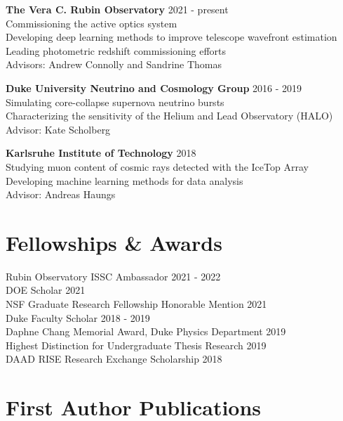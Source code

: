\documentclass[margin, 11pt]{res}
\begin{document}
\begin{resume}
\textbf{The Vera C. Rubin Observatory} \hfill 2021 - present \\
Commissioning the active optics system \\
Developing deep learning methods to improve telescope wavefront estimation \\
Leading photometric redshift commissioning efforts \\
Advisors: Andrew Connolly and Sandrine Thomas

\textbf{Duke University Neutrino and Cosmology Group} \hfill 2016 - 2019 \\
Simulating core-collapse supernova neutrino bursts \\
Characterizing the sensitivity of the Helium and Lead Observatory (HALO) \\
Advisor: Kate Scholberg

\textbf{Karlsruhe Institute of Technology} \hfill 2018 \\
Studying muon content of cosmic rays detected with the IceTop Array \\
Developing machine learning methods for data analysis \\
Advisor: Andreas Haungs

\section{Fellowships \& Awards}
Rubin Observatory ISSC Ambassador \hfill 2021 - 2022 \\
DOE Scholar \hfill 2021 \\
NSF Graduate Research Fellowship Honorable Mention \hfill 2021 \\
Duke Faculty Scholar \hfill 2018 - 2019 \\
Daphne Chang Memorial Award, Duke Physics Department \hfill 2019 \\
Highest Distinction for Undergraduate Thesis Research \hfill 2019 \\
DAAD RISE Research Exchange Scholarship \hfill 2018 \\

\newpage
\section{First Author Publications}


\end{resume}
\end{document}
